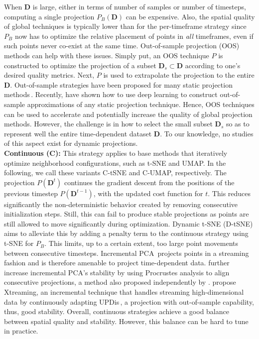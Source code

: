 When $\mathbf{D}$ is large, either in terms of number of samples or number of timesteps, computing a single projection $P_B(\mathbf{D})$ can be expensive. Also, the spatial quality of global techniques is typically lower than for the per-timeframe strategy since $P_B$ now has to optimize the relative placement of points in \emph{all} timeframes, even if such points never co-exist at the same time. Out-of-sample projection (OOS) methods can help with these issues. Simply put, an OOS technique $P$ is constructed to optimize the projection of a subset $\mathbf{D}_s \subset \mathbf{D}$ according to one's desired quality metrics. Next, $P$ is used to extrapolate the projection to the entire $\mathbf{D}$. Out-of-sample strategies have been proposed for many static projection methods\,\citep{oos}. Recently, \cite{MateusEspadoto} have shown how to use deep learning to construct out-of-sample approximations of any static projection technique. Hence, OOS techniques can be used to accelerate and potentially increase the quality of global projection methods. However, the challenge is in how to select the small subset $\mathbf{D}_s$ so as to represent well the entire time-dependent dataset $\mathbf{D}$. To our knowledge, no studies of this aspect exist for dynamic projections.\\

\noindent\textbf{Continuous (C):} This strategy applies to base methods that iteratively optimize neighborhood configurations, such as t-SNE and UMAP. In the following, we call these variants C-tSNE and C-UMAP, respectively. The projection $P(\mathbf{D}^{t})$ continues the gradient descent from the positions of the previous timestep $P(\mathbf{D}^{t-1})$, with the updated cost function for $t$. This reduces significantly the non-deterministic behavior created by removing consecutive initialization steps. Still, this can fail to produce stable projections as points are still allowed to move significantly during optimization. Dynamic t-SNE (D-tSNE)\,\citep{Rauber2016} aims to alleviate this by adding a penalty term to the continuous strategy using t-SNE for $P_B$. This limits, up to a certain extent, too large point movements between consecutive timesteps.
Incremental PCA\,\citep{ross08} projects points in a streaming fashion and is therefore amenable to project time-dependent data. \cite{Fujiwara2020} further increase incremental PCA's stability by using Procrustes analysis to align consecutive projections, a method also proposed independently by \cite{Joia2011}. \cite{Neves2020} propose Xtreaming, an incremental technique that handles streaming high-dimensional data by continuously adapting UPDis\,\citep{updis}, a projection with out-of-sample capability, thus, good stability. Overall, continuous strategies achieve a good balance between spatial quality and stability. However, this balance can be hard to tune in practice. 

